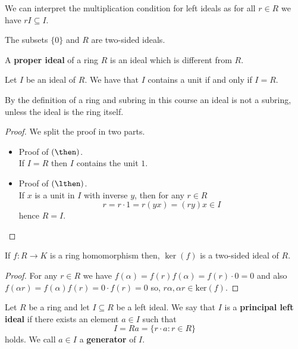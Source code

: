 \documentclass[12pt, a4paper]{article}
\begin{document}
\begin{mdnote}
    We can interpret the multiplication condition for left ideals as  for all \(r \in R\) we have \(rI \subseteq I\).
\end{mdnote}

\begin{mdexample}
    The subsets \(\{0\}\) and \(R\) are two-sided ideals.
\end{mdexample}

\begin{definition}
    A \textbf{proper ideal} of a ring \(R\) is an ideal which is different from \(R\).
\end{definition}

\begin{mdlemma}
    Let \(I\) be an ideal of \(R\). We have that \(I\) contains a unit if and only if \(I=R\).
\end{mdlemma}

\begin{mdremark}
    By the definition of a ring and subring in this course an ideal is not a subring, unless the ideal is the ring itself.
\end{mdremark}

\begin{proof}
    We split the proof in two parts.
    \begin{itemize}
        \item Proof of \((\then)\). \\
        If \(I=R\) then \(I\) contains the unit \(1\).
        \item Proof of \((\lthen)\). \\
        If \(x\) is a unit in \(I\) with inverse \(y\), then for any \(r \in R\)
        \[r = r\cdot 1 = r(yx)=(ry)x \in I\]
        hence \(R=I\).
    \end{itemize}
\end{proof}

\begin{proposition}
    If \(f:R \to K\) is a ring homomorphism then, \(\ker(f)\) is a two-sided ideal of \(R\).
\end{proposition}

\begin{proof}
   For any \(r \in R\) we have \(f(\alpha)=f(r)f(\alpha)=f(r) \cdot 0=0\) and also \(f(\alpha r)=f(\alpha)f(r)=0 \cdot f(r)=0\) so, \(r\alpha,\alpha r \in \text{ker}(f)\).
\end{proof}

\begin{definition}
    Let \(R\) be a ring and let \(I \subseteq R\) be a left ideal. We say that \(I\) is a \textbf{principal left ideal} if there exists an element \(a \in I\) such that 
    \[I = Ra = \{r \cdot a : r \in R\}\]
    holds. We call \(a \in I\) a \textbf{generator} of \(I\).
\end{definition}
\end{document}
